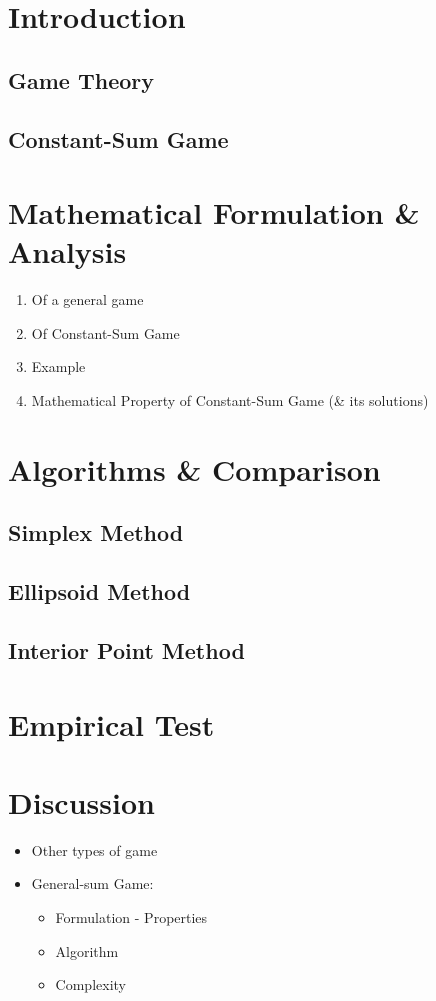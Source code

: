 \documentclass{article}
\begin{document}
\section{Introduction}

\subsection{Game Theory}

\subsection{Constant-Sum Game}


\section{Mathematical Formulation \& Analysis}

\begin{enumerate}
    \item Of a general game
    \item Of Constant-Sum Game
    \item Example
    \item Mathematical Property of Constant-Sum Game (\& its solutions)
    
\end{enumerate}

\section{Algorithms \& Comparison}
\subsection{Simplex Method}

\subsection{Ellipsoid Method}

\subsection{Interior Point Method}

\section{Empirical Test}
\section{Discussion}
\begin{itemize}
    \item Other types of game
    \item General-sum Game:
    \begin{itemize}
        \item Formulation - Properties
        \item Algorithm
        \item Complexity
    \end{itemize}
\end{itemize}
\end{document}
